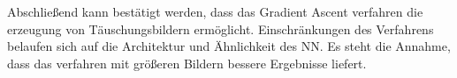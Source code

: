 Abschließend kann bestätigt werden, dass das Gradient Ascent verfahren die erzeugung von Täuschungsbildern ermöglicht. Einschränkungen des Verfahrens belaufen sich auf die Architektur und Ähnlichkeit des \ac{NN}. Es steht die Annahme, dass das verfahren mit größeren Bildern bessere Ergebnisse liefert.
